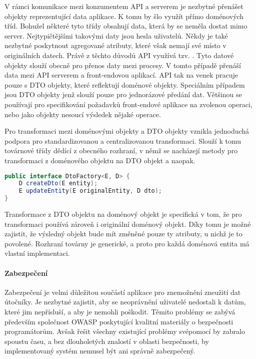 			V rámci komunikace mezi konzumentem \ac{API} a serverem je nezbytné přenášet objekty reprezentující data
			aplikace.
			K tomu by šlo využít přímo doménových tříd.
			Bohužel některé tyto třídy obsahují data, která by se neměla dostat mimo server.
			Nejtypičtějšími takovými daty jsou hesla uživatelů.
			Někdy je také nezbytné poskytnout agregované atributy, které však nemají své místo v originálních datech.
			Právě z těchto důvodů \ac{API} využívá tzv. .
			Tyto datové objekty slouží obecně pro přenos daty mezi procesy.
			V tomto případě přenáší data mezi \ac{API} serverem a front-endovou aplikací.
			\ac{API} tak na venek pracuje pouze s \ac{DTO} objekty, které reflektují doménové objekty.
			Speciálním případem jsou \ac{DTO} objekty jenž slouží pouze pro jednorázové předání dat.
			Většinou se používají pro specifikování požadavků front-endové aplikace na zvolenou operaci, nebo jako
			objekty nesoucí výsledek nějaké operace.

			Pro transformaci mezi doménovými objekty a \ac{DTO} objekty vznikla jednoduchá podpora pro standardizovanou
			a centralizovanou transformaci.
			Slouží k tomu továrnové třídy dědící z obecného rozhraní, v němž se nacházejí metody pro transformaci z doménového
			objektu na \ac{DTO} objekt a naopak.

			\begin{lstlisting}[language=Java, caption={Obecné rozhraní třídy pro transformaci mezi doménovými a DTO objekty. Zdroj: [autor]}]
public interface DtoFactory<E, D> {
    D createDto(E entity);
    E updateEntity(E originalEntity, D dto);
}
			\end{lstlisting}

			Transformace z \ac{DTO} objektu na doménový objekt je specifická v tom, že pro transformaci používá zároveň
			i originální doménový objekt.
			Díky tomu je možné zajistit, že výsledný objekt bude mít změněné pouze ty atributy, u nichž je to povolené.
			Rozhraní továrny je generické, a proto pro každá doménová entita má vlastní implementaci.

			\paragraph{Zabezpečení}

			Zabezpečení je velmi důležitou součástí aplikace pro znemožnění zneužití dat útočníky.
			Je nezbytné zajistit, aby se neoprávnění uživatelé nedostali k datům, které jim nepřísluší, a aby je nemohli
			poškodit.
			Těmito problémy se zabývá především společnost OWASP poskytující kvalitní materiály o bezpečnosti programátorům.
			Avšak řešit všechny existující problémy svépomocí by zabralo spoustu času, a bez dlouholetých znalostí v
			oblasti bezpečnosti, by implementovaný systém nemusel být ani správně zabezpečený.

